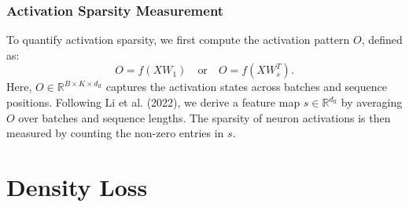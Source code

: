 \documentclass[conference]{IEEEtran}
\begin{document}
\subsubsection*{Activation Sparsity Measurement}
To quantify activation sparsity, we first compute the activation pattern \(O\), defined as: \[O = f(X W_1) \quad \text{or} \quad O = f(X W_s^T).\] Here, \(O \in \mathbb{R}^{B \times K \times d_{\text{ff}}}\) captures the activation states across batches and sequence positions. Following Li et al. (2022), we derive a feature map \(s \in \mathbb{R}^{d_{\text{ff}}}\) by averaging \(O\) over batches and sequence lengths. The sparsity of neuron activations is then measured by counting the non-zero entries in \(s\).




\section{Density Loss}
\end{document}
